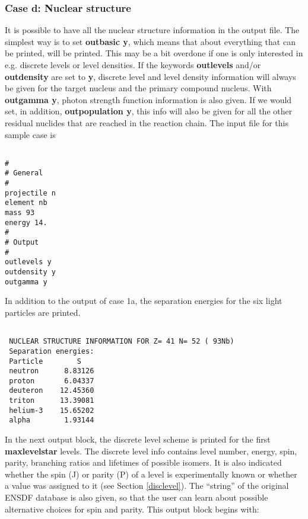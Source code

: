 \begin{samplecase}
\subsubsection{Case d: Nuclear structure}    
It is possible to have all the nuclear structure information in the output file.
The simplest way is to set {\bf outbasic y}, which means that about everything 
that can be printed, will be printed. This may be a bit overdone if one
is only interested in e.g. discrete levels or level densities. If the 
keywords {\bf outlevels} and/or {\bf outdensity} are set to {\bf y}, 
discrete level and level density information will always be given for the 
target nucleus and the primary compound nucleus. With {\bf outgamma y}, photon
strength function information is also given. If we would set, in addition,
{\bf outpopulation y}, this info will also be given for all the other residual 
nuclides that are reached in the reaction chain. 
The input file for this sample case is

{\small \begin{verbatim}

#
# General
#
projectile n
element nb
mass 93
energy 14.
#
# Output
#
outlevels y
outdensity y
outgamma y
\end{verbatim} } \renewcommand{\baselinestretch}{1.07}\small\normalsize
\noindent
In addition to the output of case 1a,
the separation energies for the six light particles are printed. 

{\small \begin{verbatim}

 NUCLEAR STRUCTURE INFORMATION FOR Z= 41 N= 52 ( 93Nb)                          
 Separation energies:                                                           
 Particle        S                                                              
 neutron      8.83126
 proton       6.04337
 deuteron    12.45360
 triton      13.39081
 helium-3    15.65202
 alpha        1.93144
\end{verbatim} } \renewcommand{\baselinestretch}{1.07}\small\normalsize
\noindent
In the next output block,
the discrete level scheme is printed for the first {\bf maxlevelstar} levels. 
The discrete level info contains level number, energy, spin, parity, branching 
ratios and lifetimes of possible isomers. It is also indicated whether the 
spin (J) or parity (P) of a level is experimentally known or whether a value 
was assigned to it (see Section \ref{disclevel}). The ``string'' of the 
original ENSDF database is also given, so that the user can learn about 
possible alternative choices for spin and parity. This output block begins with:


\end{samplecase}
